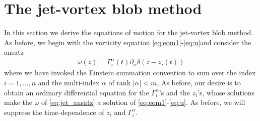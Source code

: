 \documentclass[12pt]{amsart}
\begin{document}
\section{The jet-vortex blob method}
\label{sec:jet_vortex_blob}


In this section we derive the equations of motion for the
jet-vortex blob method.
As before, we begin with the vorticity equation \eqref{eq:eom1}-\eqref{eq:u}and consider the ansatz
\begin{align}
  \omega(z) = \Gamma_i^\alpha(t) \partial_\alpha \delta(z-z_i(t))
  \label{eq:jet_ansatz}
\end{align} 
where we have invoked the Einstein summation convention to sum over 
the index $i=1,\dots,n$ and the multi-index $\alpha$ of rank $|\alpha| < m$,
As before, our desire is to obtain an ordinary differential equation for the $\Gamma^\alpha_i$'s and the $z_i$'s,
whose solutions make the $\omega$ of \eqref{eq:jet_ansatz} a solution of \eqref{eq:eom1}-\eqref{eq:u}.
As before,
we will suppress the time-dependence of $z_i$ and $\Gamma^\alpha_i$.
\end{document}
